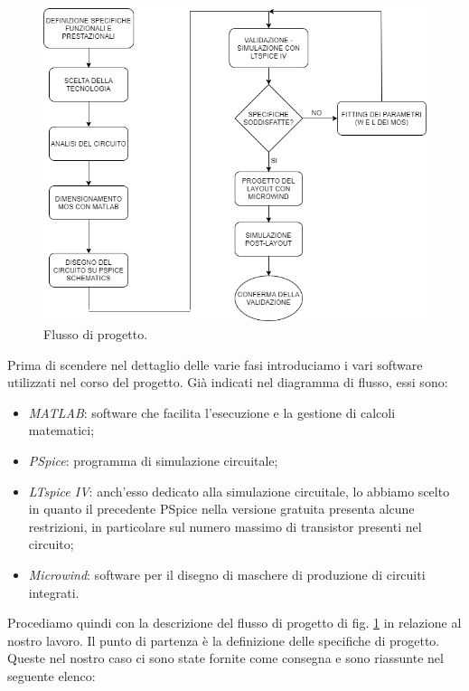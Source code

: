 \begin{figure}[hbt!]
	\centering
	\includegraphics[width=1\textwidth]{figure/WorkflowDiagram.png}
	\caption{Flusso di progetto.}
	\label{fig:workflow}
\end{figure}

Prima di scendere nel dettaglio delle varie fasi introduciamo i vari software utilizzati nel corso del progetto. Già indicati nel diagramma di flusso, essi sono:

\begin{itemize}
	\item \textit{MATLAB}: software che facilita l'esecuzione e la gestione di calcoli matematici;
	\item \textit{PSpice}: programma di simulazione circuitale;
	\item \textit{LTspice IV}: anch'esso dedicato alla simulazione circuitale, lo abbiamo scelto in quanto il precedente PSpice nella versione gratuita presenta alcune restrizioni, in particolare sul numero massimo di transistor presenti nel circuito;
	\item \textit{Microwind}: software per il disegno di maschere di produzione di circuiti integrati.
\end{itemize}

Procediamo quindi con la descrizione del flusso di progetto di fig. \ref{fig:workflow} in relazione al nostro lavoro. Il punto di partenza è la definizione delle specifiche di progetto. Queste nel nostro caso ci sono state fornite come consegna e sono riassunte nel seguente elenco:

